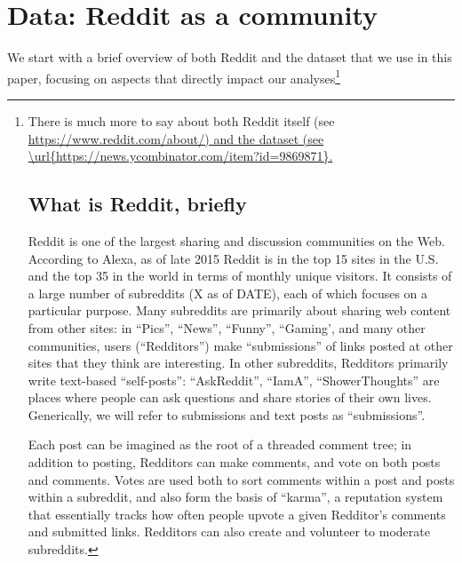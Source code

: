 \section{Data: Reddit as a community}

We start with a brief overview of both Reddit and the dataset that we use in this paper, focusing on aspects that directly impact our analyses\footnote{There is much more to say about both Reddit itself (see \url{https://www.reddit.com/about/) and the dataset (see 
\url{https://news.ycombinator.com/item?id=9869871}.}

\subsection{What is Reddit, briefly}

Reddit is one of the largest sharing and discussion communities on the Web.  According to Alexa, as of late 2015 Reddit is in the top 15 sites in the U.S. and the top 35 in the world in terms of monthly unique visitors.  It consists of a large number of subreddits (X as of DATE), each of which focuses on a particular purpose.  Many subreddits are primarily about sharing web content from other sites: in ``Pics'', ``News'', ``Funny'', ``Gaming', and many other communities, users (``Redditors'') make ``submissions'' of links posted at other sites that they think are interesting.  In other subreddits, Redditors primarily write text-based ``self-posts'': ``AskReddit'', ``IamA'', ``ShowerThoughts'' are places where people can ask questions and share stories of their own lives.  Generically, we will refer to submissions and text posts as ``submissions''.  



Each post can be imagined as the root of a threaded comment tree; in addition to posting, Redditors can make comments, and vote on both posts and comments.  Votes are used both to sort comments within a post and posts within a subreddit, and also form the basis of ``karma'', a reputation system that essentially tracks how often people upvote a given Redditor's comments and submitted links.  Redditors can also create and volunteer to moderate subreddits.

}
